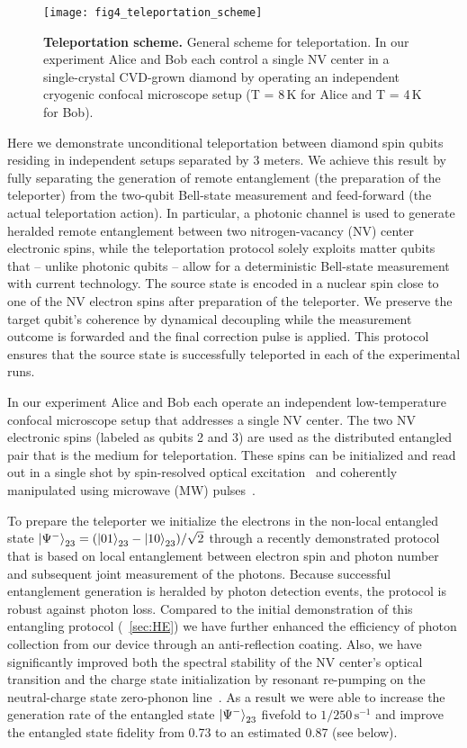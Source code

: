\begin{figure*}
    \centering
    \texttt{[image: fig4\_teleportation\_scheme]}
    \caption{
    \label{LDE:fig4} 
    \textbf{Teleportation scheme.} 
    General scheme for teleportation. In our experiment Alice and Bob each control a single NV center in a single-crystal CVD-grown diamond by operating an independent cryogenic confocal microscope setup (T = 8\,K for Alice and T  = 4\,K for Bob). 
    }
\end{figure*}

Here we demonstrate unconditional teleportation between diamond spin qubits residing in independent setups separated by 3 meters. We achieve this result by fully separating the generation of remote entanglement (the preparation of the teleporter) from the two-qubit Bell-state measurement and feed-forward (the actual teleportation action). In particular, a photonic channel is used to generate heralded remote entanglement between two nitrogen-vacancy (NV) center electronic spins, while the teleportation protocol solely exploits matter qubits that – unlike photonic qubits – allow for a deterministic Bell-state measurement with current technology. The source state is encoded in a nuclear spin close to one of the NV electron spins after preparation of the teleporter. We preserve the target qubit's coherence by dynamical decoupling while the measurement outcome is forwarded and the final correction pulse is applied. This protocol ensures that the source state is successfully teleported in each of the experimental runs.

In our experiment Alice and Bob each operate an independent low-temperature confocal microscope setup that addresses a single NV center. The two NV electronic spins (labeled as qubits 2 and 3) are used as the distributed entangled pair that is the medium for teleportation. These spins can be initialized and read out in a single shot by spin-resolved optical excitation~\cite{Robledo_Nature_2011} and coherently manipulated using microwave (MW) pulses~\cite{Lange_Science_2010}. 

To prepare the teleporter we initialize the electrons in the non-local entangled state $\left|\Psi^-\right\rangle_{23} = (\left|01\right\rangle_{23} - \left|10\right\rangle_{23})/\sqrt2$ through a recently demonstrated protocol~\cite{Barrett_Phys.Rev.A_2005,Bernien_Nature_2013} that is based on local entanglement between electron spin and photon number and subsequent joint measurement of the photons. Because successful entanglement generation is heralded by photon detection events, the protocol is robust against photon loss. Compared to the initial demonstration of this entangling protocol (~\ref{sec:HE}) we have further enhanced the efficiency of photon collection from our device through an anti-reflection coating. Also, we have significantly improved both the spectral stability of the NV center's optical transition and the charge state initialization by resonant re-pumping on the neutral-charge state zero-phonon line~\cite{Siyushev_Phys.Rev.Lett._2013}. As a result we were able to increase the generation rate of the entangled state $\left|\Psi^-\right\rangle_{23}$ fivefold to $1/250\, \mathrm s^{-1}$ and improve the entangled state fidelity from 0.73 to an estimated 0.87 (see below).

